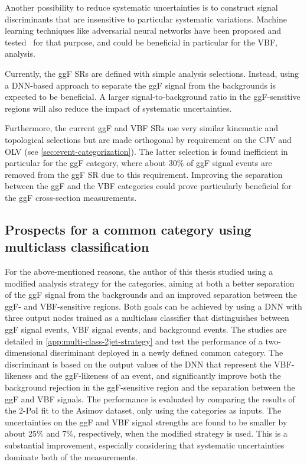 Another possibility to reduce systematic uncertainties is to construct signal discriminants that are insensitive to particular systematic variations. Machine learning techniques like adversarial neural networks have been proposed and tested~\cite{Englert2019,adversarialClavijoJoseM} for that purpose, and could be beneficial in particular for the VBF, \HWW analysis.

Currently, the ggF SRs are defined with simple analysis selections. Instead, using a DNN-based approach to separate the ggF signal from the backgrounds is expected to be beneficial. 
A larger signal-to-background ratio in the ggF-sensitive regions will also reduce the impact of systematic uncertainties. 

Furthermore, the current ggF and VBF \TwoJet SRs use very similar kinematic and topological selections but are made orthogonal by requirement on the CJV and OLV (see \cref{sec:event-categorization}). The latter selection is found inefficient in particular for the ggF \TwoJet category, where about 30\% of ggF signal events are removed from the ggF SR due to this requirement. Improving the separation between the ggF \TwoJet and the VBF \TwoJet categories could prove particularly beneficial for the ggF \TwoJet cross-section measurements. 

\subsection{Prospects for a common \TwoJet category using multiclass classification}
For the above-mentioned reasons, the author of this thesis studied using a modified analysis strategy for the \TwoJet categories, aiming at both a better separation of the ggF signal from the backgrounds and an improved separation between the ggF- and VBF-sensitive \TwoJet regions. 
Both goals can be achieved by using a DNN with three output nodes trained as a multiclass classifier that distinguishes between ggF signal events, VBF signal events, and background events. 
The studies are detailed in \cref{app:multi-class-2jet-strategy} and test the performance of a two-dimensional discriminant deployed in a newly defined common \TwoJet category.
The discriminant is based on the output values of the DNN that represent the VBF-likeness and the ggF-likeness of an event, and significantly improve both the background rejection in the ggF-sensitive region and the separation between the ggF and VBF signals.
The performance is evaluated by comparing the results of the 2-PoI fit to the Asimov dataset, only using the \TwoJet categories as inputs. 
The uncertainties on the ggF and VBF signal strengths are found to be smaller by about 25\% and 7\%, respectively, when the modified \TwoJet strategy is used. 
This is a substantial improvement, especially considering that systematic uncertainties dominate both of the measurements. 

